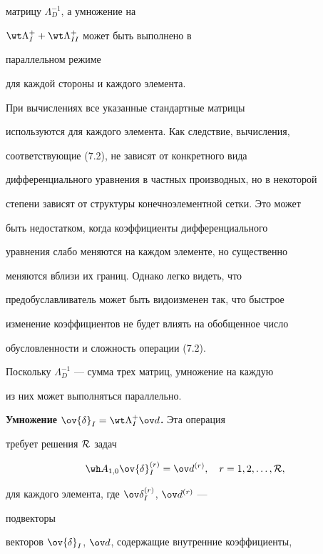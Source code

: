 матрицу $\Lambda^{-1}_D$, а умножение на 


$\wt \Lambda^{+}_I+\wt \Lambda^+_{II}$ может быть выполнено в 


параллельном режиме


для каждой стороны и каждого элемента.


При вычислениях все указанные стандартные матрицы 


используются для каждого элемента. Как следствие, вычисления, 


соответствующие (7.2), не зависят от конкретного вида 


дифференциального уравнения в частных производных, но в некоторой


степени зависят от структуры конечноэлементной сетки. Это может 


быть недостатком, когда коэффициенты дифференциального 


уравнения слабо меняются на каждом элементе, но существенно 


меняются вблизи их границ. Однако легко видеть, что 


предобуславливатель может быть видоизменен так, что быстрое 


изменение коэффициентов не будет влиять на обобщенное число 


обусловленности и сложность операции (7.2).





Поскольку $\Lambda^{-1}_D$ --- сумма трех матриц, умножение на каждую 


из них может выполняться параллельно. 


 


{\bf Умножение $\ov {\delta}_I=\wt \Lambda^{+}_I \ov d$.} Эта операция 


требует решения $\cal R$ задач


\begin{equation}\label{7.7}


\wh A_{1,0} \ov {\delta}^{(r)}_I= \ov d^{(r)},


\quad r=1,2,\dotsc,{\cal R},


\end{equation} 


для каждого элемента, где $\ov \delta^{(r)}_I$, $\ov d^{(r)}$ ---


подвекторы 


векторов $\ov {\delta}_I$, $\ov d$, содержащие внутренние коэффициенты, 


